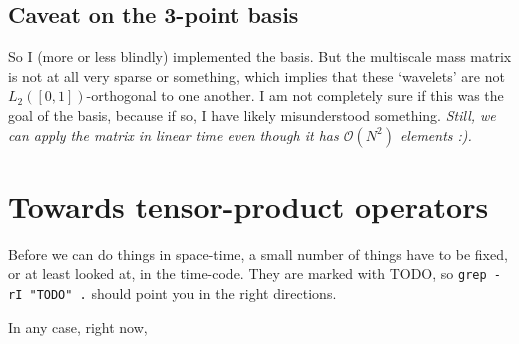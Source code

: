 \documentclass[11pt,a4paper]{amsart}
\theoremstyle{definition}
\begin{document}
\subsection{Caveat on the 3-point basis}
So I (more or less blindly) implemented the basis. But the multiscale mass matrix
is not at all very sparse or something, which implies that these `wavelets' are
not $L_2([0,1])$-orthogonal to one another. I am not completely sure if this was
the goal of the basis, because if so, I have likely misunderstood something.
\emph{Still, we can apply the matrix in linear time even though it has $\mathcal O(N^2)$
elements :).}

\section{Towards tensor-product operators}
Before we can do things in space-time, a small number of things have to be fixed,
or at least looked at, in the time-code. They are marked with TODO, so
\texttt{grep -rI "TODO" .} should point you in the right directions.

In any case, right now, 
\end{document}
